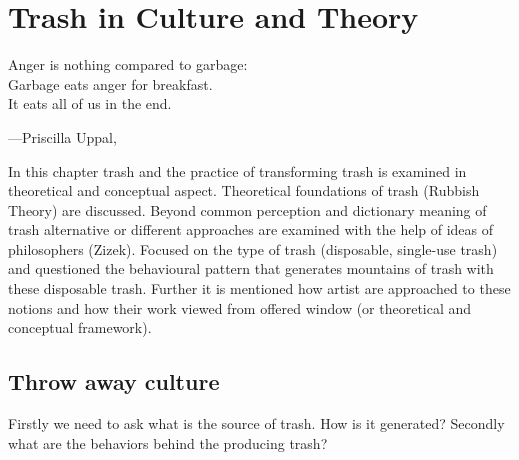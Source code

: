 \chapter{Trash in Culture and Theory}





\epigraph{Anger is nothing compared to garbage:\\ Garbage eats anger for breakfast.\\ It eats all of us in the end.}{\hfill---Priscilla Uppal, }





%
%
In this chapter trash and the practice of transforming trash is examined in theoretical and conceptual aspect. Theoretical foundations of trash (Rubbish Theory) are discussed. Beyond common perception and dictionary meaning of trash alternative or different approaches are examined with the help of ideas of philosophers (Zizek). Focused on the type of trash (disposable, single-use trash) and questioned the behavioural pattern that generates mountains of trash with these disposable trash. Further it is mentioned how artist are approached to these notions and how their work viewed from offered window (or theoretical and conceptual framework).





%
%
\section{Throw away culture}
Firstly we need to ask what is the source of trash. How is it generated? Secondly what are the behaviors behind the producing trash?





%
%
    

